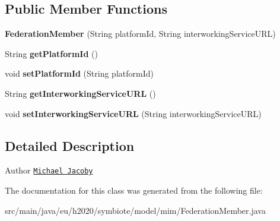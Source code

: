 \subsection*{Public Member Functions}
\begin{DoxyCompactItemize}
\item 
\mbox{\label{classeu_1_1h2020_1_1symbiote_1_1model_1_1mim_1_1FederationMember_ae4c6d9a8f1f2a82d2bc5bbf66790385c}} 
{\bfseries Federation\+Member} (String platform\+Id, String interworking\+Service\+U\+RL)
\item 
\mbox{\label{classeu_1_1h2020_1_1symbiote_1_1model_1_1mim_1_1FederationMember_a1b800e42a8c7b7dad2e665a4282312ca}} 
String {\bfseries get\+Platform\+Id} ()
\item 
\mbox{\label{classeu_1_1h2020_1_1symbiote_1_1model_1_1mim_1_1FederationMember_a8ce76fbe1aa60cca737471f7dcc4bcad}} 
void {\bfseries set\+Platform\+Id} (String platform\+Id)
\item 
\mbox{\label{classeu_1_1h2020_1_1symbiote_1_1model_1_1mim_1_1FederationMember_a200235efa57ee0f5270f480ae90497f1}} 
String {\bfseries get\+Interworking\+Service\+U\+RL} ()
\item 
\mbox{\label{classeu_1_1h2020_1_1symbiote_1_1model_1_1mim_1_1FederationMember_ad78856c13d31be6cce967372285b1dfc}} 
void {\bfseries set\+Interworking\+Service\+U\+RL} (String interworking\+Service\+U\+RL)
\end{DoxyCompactItemize}


\subsection{Detailed Description}
\begin{DoxyAuthor}{Author}
\href{mailto:michael.jacoby@iosb.fraunhofer.de}{\tt Michael Jacoby} 
\end{DoxyAuthor}


The documentation for this class was generated from the following file\+:\begin{DoxyCompactItemize}
\item 
src/main/java/eu/h2020/symbiote/model/mim/Federation\+Member.\+java\end{DoxyCompactItemize}
